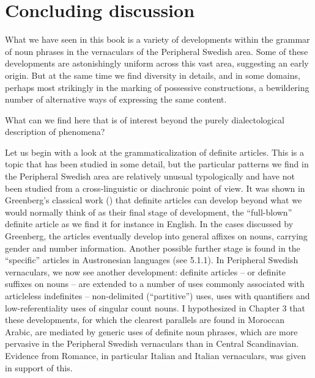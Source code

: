 \begin{figure}[h]

\begin{minipage}{7.2362in}

\end{minipage}

\end{figure}
\chapter[Concluding discussion]{\rmfamily\bfseries Concluding discussion}

\begin{styleBodyTextFirst}
What we have seen in this book is a variety of developments within the grammar of noun phrases in the vernaculars of the Peripheral Swedish area. Some of these developments are astonishingly uniform across this vast area, suggesting an early origin. But at the same time we find diversity in details, and in some domains, perhaps most strikingly in the marking of possessive constructions, a bewildering number of alternative ways of expressing the same content. 

\end{styleBodyTextFirst}

\begin{styleBodytextC}
What can we find here that is of interest beyond the purely dialectological description of phenomena? 

\end{styleBodytextC}

\begin{styleBodytextC}
Let us begin with a look at the grammaticalization of definite articles. This is a topic that has been studied in some detail, but the particular patterns we find in the Peripheral Swedish area are relatively unusual typologically and have not been studied from a cross-linguistic or diachronic point of view. It was shown in Greenberg’s classical work (\citet{Greenberg1978}) that definite articles can develop beyond what we would normally think of as their final stage of development, the “full-blown” definite article as we find it for instance in English. In the cases discussed by Greenberg, the articles eventually develop into general affixes on nouns, carrying gender and number information. Another possible further stage is found in the “specific” articles in Austronesian languages (see 5.1.1). In Peripheral Swedish vernaculars, we now see another development: definite articles – or definite suffixes on nouns – are extended to a number of uses commonly associated with articleless indefinites – non-delimited (“partitive”) uses, uses with quantifiers and low-referentiality uses of singular count nouns. I hypothesized in Chapter 3 that these developments, for which the clearest parallels are found in Moroccan Arabic, are mediated by generic uses of definite noun phrases, which are more pervasive in the Peripheral Swedish vernaculars than in Central Scandinavian. Evidence from Romance, in particular Italian and Italian vernaculars, was given in support of this. 

\end{styleBodytextC}

